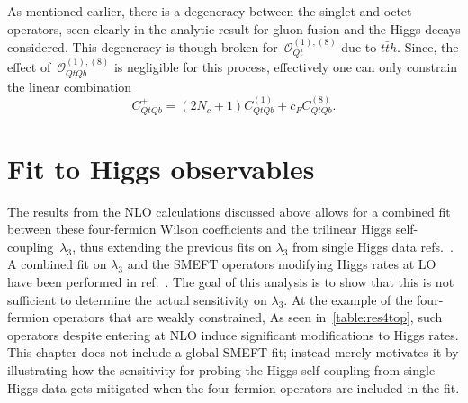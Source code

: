 	\par As mentioned earlier, there is a degeneracy between the singlet and octet operators, seen clearly in the analytic result for gluon fusion and the Higgs decays considered. This degeneracy is though broken for~$\mathcal O_{Qt}^{(1),(8)}$ due to $t\bar t h$. Since, the effect of~$\mathcal O_{QtQb}^{(1),(8)}$ is negligible for this process, effectively one can only constrain the linear combination
	\begin{equation}
		C_{QtQb}^+= (2N_c+1 )C_{QtQb}^{(1)} + c_F   C_{QtQb}^{(8)}.
		\label{eq:CQtQbplus}
	\end{equation}
	\section{Fit to Higgs observables \label{sec:fit}}
	\par The results from the  NLO calculations discussed above allows for a combined fit between these four-fermion Wilson coefficients and the trilinear Higgs self-coupling~$\lambda_3$, thus extending the previous fits on $\lambda_3$ from single Higgs data refs.~\cite{Gorbahn:2016uoy, Degrassi:2016wml, Bizon:2016wgr, Maltoni:2017ims, Degrassi:2021uik}.
A combined fit on $\lambda_3$ and the SMEFT operators modifying Higgs rates at LO have been performed in ref.~\cite{DiVita:2017eyz}. The goal of this analysis is to show that this is not sufficient to determine the actual sensitivity on $\lambda_3$. At the example of the four-fermion operators that are weakly constrained, As seen in~\autoref{table:res4top}, such operators despite entering at NLO induce significant modifications to Higgs rates.
	This chapter does not include a global SMEFT fit; instead merely motivates it by illustrating how the sensitivity for probing the Higgs-self coupling from single Higgs data gets mitigated when the four-fermion operators are included in the fit.
